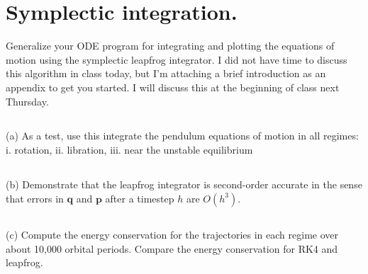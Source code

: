 \section{Symplectic integration.}

Generalize your ODE program for integrating and plotting the equations of motion using the symplectic leapfrog integrator. I did not have
time to discuss this algorithm in class today, but I’m attaching a brief
introduction as an appendix to get you started. I will discuss this at the
beginning of class next Thursday.
\subsection{}
(a) As a test, use this integrate the pendulum equations of motion in
all regimes:
i. rotation,
ii. libration,
iii. near the unstable equilibrium




\subsection{}
(b) Demonstrate that the leapfrog integrator is second-order accurate
in the sense that errors in $\mathbf{q}$ and $\mathbf{p}$ after a timestep $h$ are $O(h^3)$.



\subsection{}
(c) Compute the energy conservation for the trajectories in each regime
over about 10,000 orbital periods. Compare the energy conservation for RK4 and leapfrog.